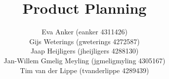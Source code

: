 \documentclass{tudelft-report}
\begin{document}
\frontmatter

\title[For MoodCat]{Product Planning}
\author{\small Eva Anker (eanker 4311426)\\
		Gijs Weterings (gweterings 4272587)\\
		Jaap Heijligers (jheijligers 4288130)\\
		Jan-Willem Gmelig Meyling (jgmeligmyling 4305167)\\
		Tim van der Lippe (tvanderlippe 4289439)}
\makecover



\tableofcontents




\mainmatter



\appendix

%


\end{document}

